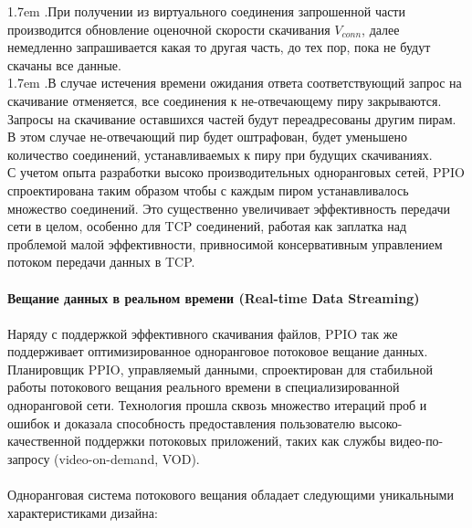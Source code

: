\documentclass[10pt,a4paper]{article}
\begin{document}
\hangindent 1.7em
.\quad При получении из виртуального соединения запрошенной части производится обновление оценочной скорости скачивания $V_{conn}$, далее немедленно запрашивается какая то другая часть, до тех пор, пока не будут скачаны все данные.
\vspace{-0.8em}
\\ 

\hangindent 1.7em
.\quad В случае истечения времени ожидания ответа соответствующий запрос на скачивание отменяется, все соединения к не-отвечающему пиру закрываются. Запросы на скачивание оставшихся частей будут переадресованы другим пирам. В этом случае не-отвечающий пир будет оштрафован, будет уменьшено количество соединений, устанавливаемых к пиру при будущих скачиваниях.
\vspace{-0.5em}
\\ 

\noindent   
С учетом опыта разработки высоко производительных одноранговых сетей, PPIO спроектирована таким образом чтобы с каждым пиром устанавливалось множество соединений. Это существенно увеличивает эффективность передачи сети в целом, особенно для TCP соединений, работая как заплатка над проблемой малой эффективности, привносимой консервативным управлением потоком передачи данных в TCP.
\vspace{-0.5em}
\\ \\ {\bf Вещание данных в реальном времени (Real-time Data Streaming)}
\vspace{-0.5em}
\\ \\Наряду с поддержкой эффективного скачивания файлов, PPIO так же поддерживает оптимизированное одноранговое потоковое вещание данных. Планировщик PPIO, управляемый данными, спроектирован для стабильной работы потокового вещания реального времени в специализированной одноранговой сети\cite{article12}. Технология прошла сквозь множество итераций проб и ошибок и доказала способность предоставления пользователю высоко-качественной поддержки потоковых приложений, таких как службы видео-по-запросу (video-on-demand, VOD).
\vspace{-0.5em}
\\ \\Одноранговая система потокового вещания обладает следующими уникальными характеристиками дизайна:
\vspace{-0.8em}
\\
\end{document}
